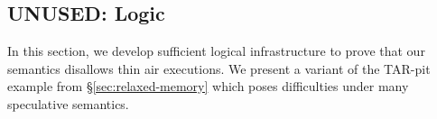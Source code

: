 \documentclass[conference]{IEEEtran}
\theoremstyle{plain}
\theoremstyle{definition}
\begin{document}



\subsection{UNUSED: Logic}
\label{app:logic}

\newcommand{\closed}{\textsf{closed}}
\newcommand{\pLTL}{\textsf{PLTL}}
\newcommand{\once}{\Diamond^{-1}}
\newcommand{\always}{\Box^{-1}}
\newcommand{\afo}{\phi}
\newcommand{\bfo}{\psi}
\newcommand{\mods}{\textsf{Models}}

In this section, we develop sufficient logical infrastructure to prove that
our semantics disallows thin air executions.  We present a variant of the
TAR-pit example from \S\ref{sec:relaxed-memory} which poses difficulties
under many speculative semantics.
\end{document}
